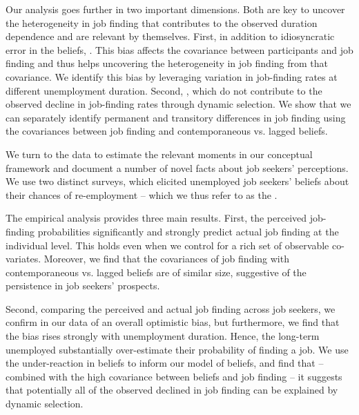 \documentclass[12pt]{article}
\newcommand{\highlightB}[1]{{\emph{\color{MyBlue}{#1}}}}
\newcommand{\highlightO}[1]{{\emph{\color{MyOrange}{#1}}}} \usepackage[bookmarks=true,bookmarksnumbered=true,colorlinks=true,linkcolor=MyBlue,citecolor=MyRed,filecolor=MyBlue,urlcolor=MyGreen]{hyperref} 
\theoremstyle{definition}
\begin{document}
Our analysis goes further in two important dimensions. Both are key to uncover the heterogeneity in job finding that contributes to the observed duration dependence and are relevant by themselves. First, in addition to idiosyncratic error in the beliefs, \highlightO{we allow job seekers' beliefs to systematically over- or under-react to differences in job finding, either across job seekers or over the unemployment spell}. This bias affects the covariance between participants and job finding and thus helps uncovering the heterogeneity in job finding from that covariance. We identify this bias by leveraging variation in job-finding rates at different unemployment duration. Second, \highlightO{we allow for transitory differences in job seekers' job finding within a spell (e.g., temporary spells of reduced search, vacancy supply shocks)}, which do not contribute to the observed decline in job-finding rates through dynamic selection. We show that we can separately identify permanent and transitory differences in job finding using the covariances between job finding and contemporaneous vs. lagged beliefs. 

We turn to the data to estimate the relevant moments in our conceptual framework and document  a number of novel facts about job seekers' perceptions. We use two distinct surveys, which elicited unemployed job seekers' beliefs about their chances of re-employment -- which we thus refer to as the \highlightB{elicited or perceived job-finding probability}.

The empirical analysis provides three main results. First, the perceived job-finding probabilities significantly and strongly predict actual job finding at the individual level. This holds even when we  control for a rich set of observable co-variates. Moreover, we find that the covariances of job finding with contemporaneous vs. lagged  beliefs are of similar size, suggestive of the persistence in job seekers' prospects.

Second, comparing the perceived and actual job finding across job seekers, we confirm in our data of an overall optimistic bias, but furthermore, we find that the bias rises strongly with unemployment duration. Hence, the long-term unemployed substantially over-estimate their probability of finding a job. We use the under-reaction in beliefs to  inform our model of beliefs, and find that -- combined with the high covariance between beliefs and job  finding -- it suggests that potentially all of the observed declined in job finding can be explained by dynamic selection.
\end{document}
